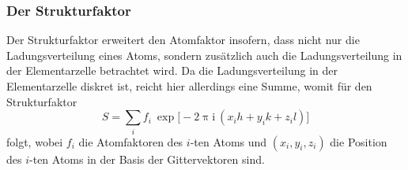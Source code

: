 \subsubsection{Der Strukturfaktor}
\label{ssub:der_strukturfaktor}

Der Strukturfaktor erweitert den Atomfaktor insofern, dass nicht nur die
Ladungsverteilung eines Atoms, sondern zusätzlich auch die
Ladungsverteilung in der Elementarzelle betrachtet wird.
Da die Ladungsverteilung in der Elementarzelle diskret ist, reicht hier
allerdings eine Summe, womit für den Strukturfaktor
\begin{equation}
  S = \sum_i f_i\ \exp\big[-2\uppi\mathrm{i}\ (x_ih + y_ik + z_il)\big]
  \label{eq:strukturfaktor}
\end{equation}
folgt, wobei $f_i$ die Atomfaktoren des $i$-ten Atoms und $(x_i, y_i, z_i)$ die
Position des $i$-ten Atoms in der Basis der Gittervektoren sind.
